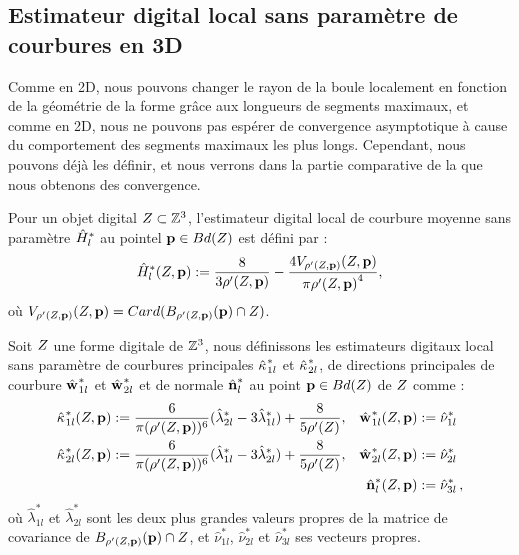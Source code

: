 \subsection{Estimateur digital local sans paramètre de courbures en 3D}
%
Comme en 2D, nous pouvons changer le rayon de la boule localement en fonction de la géométrie de la forme grâce aux longueurs de segments maximaux, et comme en 2D, nous ne pouvons pas espérer de convergence asymptotique à cause du comportement des segments maximaux les plus longs. Cependant, nous pouvons déjà les définir, et nous verrons dans la partie comparative de la  que nous obtenons des convergence.
%
\begin{definition}
  Pour un objet digital $Z \subset \mathbb{Z}^3$, l'estimateur digital local de
  courbure moyenne sans paramètre $\hat{H}^{*}_{l}$ au pointel $\mathbf{p} \in
  Bd({Z})$ est défini par :
  \begin{equation}
    \hat{H}^{*}_{l}( Z, \mathbf{p} ) := \frac{8}{3 {\rho'(Z, \mathbf{p})}} - \frac{4 V_{{\rho'(Z, \mathbf{p})}}(Z, \mathbf{p})}{\pi{{\rho'(\ensuremath{Z}, \ensuremath{\mathbf{p}})}}^4} ,
    \label{def:curvature-estimator-3d-mean-pfl}
  \end{equation}
  où $V_{\rho'(Z, \mathbf{p})}(Z, \mathbf{p}) = Card(B_{\rho'(Z, \mathbf{p})}(\mathbf{p}) \cap Z)$.
\end{definition}
%
\begin{definition}
  Soit $Z$ une forme digitale de $\mathbb{Z}^3$, nous définissons les estimateurs
  digitaux local sans paramètre de courbures principales $\hat{\kappa_{}}_{1l}^{*}$ et
  $\hat{\kappa_{}}_{2l}^{*}$, de directions principales de courbure $\hat{\mathbf{w}_{}}_{1l}^{*}$ et
  $\hat{\mathbf{w}_{}}_{2l}^{*}$ et de normale $\hat{\mathbf{n}{}}^{*}_{l}$ au point $\mathbf{p} \in
  Bd({Z})$ de $Z$ comme :
  \begin{align}
      \hat{\kappa_{}}_{1l}^{*}(Z, \mathbf{p})  &:= \frac{6}{\pi (\rho'(Z, \mathbf{p}))^6}(\hat{\lambda}^{*}_{2l} - 3\hat{\lambda}^{*}_{1l}) + \frac{8}{5 \rho'(Z)},
      &\hat{\mathbf{w}_{}}_{1l}^{*}(Z, \mathbf{p}) &:= \hat{\nu}^{*}_{1l} \\
      \hat{\kappa_{}}_{2l}^{*}(Z, \mathbf{p}) &:= \frac{6}{\pi (\rho'(Z, \mathbf{p}))^6}(\hat{\lambda}^{*}_{1l} - 3\hat{\lambda}^{*}_{2l}) + \frac{8}{5 \rho'(Z)},
      &\hat{\mathbf{w}_{}}_{2l}^{*}(Z, \mathbf{p}) &:= \hat{\nu}^{*}_{2l}\\
      & &\hat{\mathbf{n}{}}^{*}_{l}(Z, \mathbf{p}) &:=\hat{\nu}^{*}_{3l}\,,
  \end{align}
  où $\hat{\lambda}^{*}_{1l}$ et $\hat{\lambda}^{*}_{2l}$ sont les deux plus grandes
  valeurs propres de la matrice de covariance de $B_{{\rho'(Z, \mathbf{p})}}(\mathbf{p})
  \cap Z$, et $ \hat{\nu}^{*}_{1l}$, $\hat{\nu}^{*}_{2l}$ et $\hat{\nu}^{*}_{3l}$
  ses vecteurs propres.
  \label{def:curvature-estimator-3d-k1k2-pfl}
\end{definition}
%

